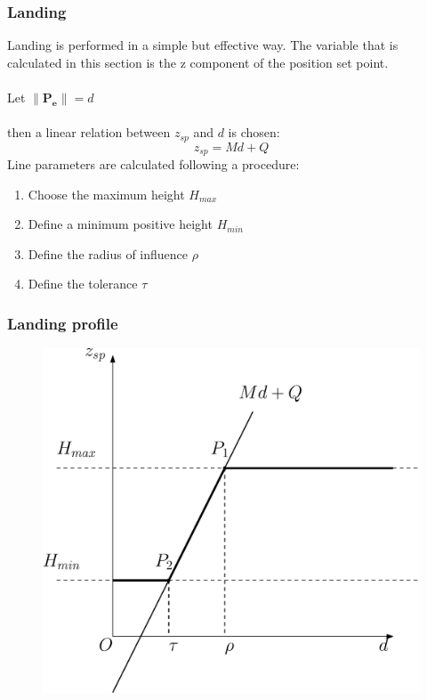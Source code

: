 \documentclass[xcolor=dvipsnames]{beamer}
\begin{document}
\begin{frame}[t]
\frametitle{Landing}
Landing is performed in a simple but effective way. The variable that is calculated in this section is the z component of the position set point. \\~\\

Let $\lVert \boldsymbol{P_e} \rVert = d$ \\~\\

then a linear relation between $z_{sp}$ and $d$ is chosen:
\begin{equation}
	z_{sp} = M d + Q
\end{equation}
Line parameters are calculated following a procedure:
\begin{enumerate}
\item Choose the maximum height $H_{max}$
\item Define a minimum positive height $H_{min}$
\item Define the radius of influence $\rho$
\item Define the tolerance $\tau$
\end{enumerate}

\end{frame}

\begin{frame}
\frametitle{Landing profile}
\begin{figure}
\includegraphics[height = 0.8\textheight]{f/profile.eps}
\end{figure}
\end{frame}
\end{document}

